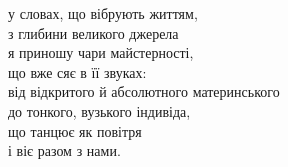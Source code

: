 у словах, що вібрують життям,\\
з глибини великого джерела\\
я приношу чари майстерності,\\
що вже сяє в її звуках:\\
від відкритого й абсолютного материнського\\
до тонкого, вузького індивіда,\\
що танцює як повітря\\
і віє разом з нами.\\
